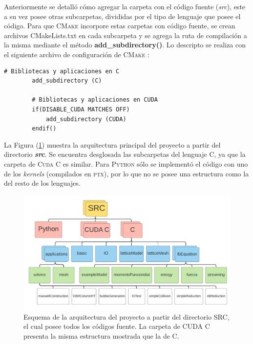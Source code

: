 Anteriormente se detalló cómo agregar la carpeta con el código fuente (\textit{src}), este a su vez posee otras subcarpetas, divididas por el tipo de lenguaje que posee el código. Para que \textsc{CMake} incorpore estas carpetas con código fuente, se crean archivos CMakeLists.txt en cada subcarpeta y se agrega la ruta de compilación a la misma mediante el método \textbf{add\_subdirectory()}. Lo descripto se realiza  con el siguiente archivo de configuración de \textsc{CMake} :

{\footnotesize
	\begin{frame}{}
		\begin{lstlisting}[frame=single]
		# Bibliotecas y aplicaciones en C
		add_subdirectory (C)

		# Bibliotecas y aplicaciones en CUDA
		if(DISABLE_CUDA MATCHES OFF)
			add_subdirectory (CUDA)
		endif()
		\end{lstlisting}
		
	\end{frame}
}

La Figura (\ref{fig:arq_proyecto}) muestra la arquitectura principal del proyecto a partir del directorio \textit{\textbf{src}}. Se encuentra desglosada las subcarpetas del lenguaje \textsc{C}, ya que la carpeta de \textsc{Cuda C} es similar. Para \textsc{Python} sólo se implementó el código con uno de los \textit{kernels} (compilados en \textsc{ptx}), por lo que no se posee una estructura como la del resto de los lenguajes.

\begin{figure}[htbp]
	\centering
	\includegraphics[width=\textwidth]{figs/cap3/arquitectura_del_proyecto_LBCUDA_Test}
	\caption{Esquema de la arquitectura del proyecto a partir del directorio SRC, el cual posee todos los códigos fuente. La carpeta de CUDA C presenta la misma estructura mostrada que la de C.}
	\label{fig:arq_proyecto}	
\end{figure}

